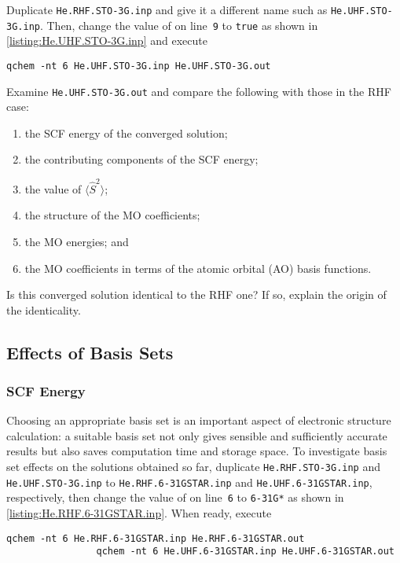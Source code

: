 		Duplicate \texttt{He.RHF.STO-3G.inp} and give it a different name such as \texttt{He.UHF.STO-3G.inp}.
		Then, change the value of  on line~\texttt{9} to \texttt{true} as shown in \cref{listing:He.UHF.STO-3G.inp} and execute
			\begin{lstlisting}[style = custombash]
				qchem -nt 6 He.UHF.STO-3G.inp He.UHF.STO-3G.out
			\end{lstlisting}
			
			\begin{Task}
				Examine \texttt{He.UHF.STO-3G.out} and compare the following with those in the RHF case: 
				\begin{enumerate}[topsep=0pt,itemsep=-1ex,partopsep=1ex,parsep=1ex,label=(\alph*)]
					\item the SCF energy of the converged solution;
					\item the contributing components of the SCF energy;
					\item the value of $\langle \hat{S}^2 \rangle$;
					\item the structure of the MO coefficients;
					\item the MO energies; and
					\item the MO coefficients in terms of the atomic orbital (AO) basis functions.
				\end{enumerate}
				Is this converged solution identical to the RHF one? If so, explain the origin of the identicality.
			\end{Task}

		
	\subsection{Effects of Basis Sets}
		
		\subsubsection{SCF Energy}
	
		Choosing an appropriate basis set is an important aspect of electronic structure calculation: a suitable basis set not only gives sensible and sufficiently accurate results but also saves computation time and storage space.
		To investigate basis set effects on the solutions obtained so far, duplicate \texttt{He.RHF.STO-3G.inp} and \texttt{He.UHF.STO-3G.inp} to \texttt{He.RHF.6-31GSTAR.inp} and \texttt{He.UHF.6-31GSTAR.inp}, respectively, then change the value of  on line~\texttt{6} to \texttt{6-31G*} as shown in \cref{listing:He.RHF.6-31GSTAR.inp}.
		When ready, execute
			\begin{lstlisting}[style = custombash]
				qchem -nt 6 He.RHF.6-31GSTAR.inp He.RHF.6-31GSTAR.out
				qchem -nt 6 He.UHF.6-31GSTAR.inp He.UHF.6-31GSTAR.out
			\end{lstlisting}
			

